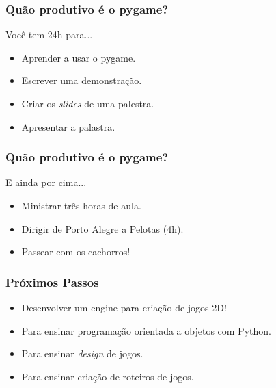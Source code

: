 \begin{frame}
    \frametitle{Quão produtivo é o pygame?}

    \vfill
    \begin{center}
        Você tem 24h para...
        \begin{itemize}
            \item Aprender a usar o pygame.
            \item Escrever uma demonstração.
            \item Criar os \textit{slides} de uma palestra.
            \item Apresentar a palastra.
        \end{itemize}
    \end{center}
    \vfill
\end{frame}

\begin{frame}
    \frametitle{Quão produtivo é o pygame?}

    \vfill
    \begin{center}
        E ainda por cima...
        \begin{itemize}
            \item Ministrar três horas de aula.
            \item Dirigir de Porto Alegre a Pelotas (4h).
            \vfill
            \item Passear com os cachorros!
        \end{itemize}
    \end{center}
    \vfill
\end{frame}




\begin{frame}
    \frametitle{Próximos Passos}

    \begin{itemize}
        \item Desenvolver um engine para criação de jogos 2D!
        \item Para ensinar programação orientada a objetos com Python.
        \item Para ensinar \textit{design} de jogos.
        \item Para ensinar criação de roteiros de jogos.
    \end{itemize}
\end{frame}

